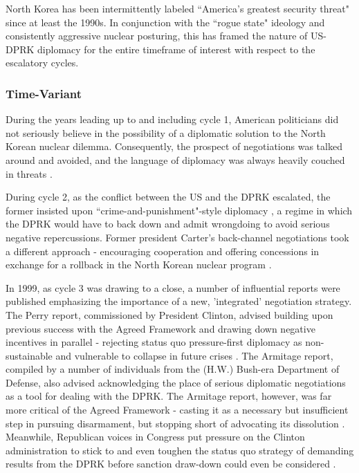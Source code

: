 \documentclass{article}
\begin{document}
North Korea has been intermittently labeled ``America's greatest security threat"\cite{cumings} since at least the 1990s. In conjunction with the ``rogue state" ideology and consistently aggressive nuclear posturing, this has framed the nature of US-DPRK diplomacy for the entire timeframe of interest with respect to the escalatory cycles.

\subsubsection{Time-Variant}

During the years leading up to and including cycle 1, American politicians did not seriously believe in the possibility of a diplomatic solution to the North Korean nuclear dilemma. Consequently, the prospect of negotiations was talked around and avoided, and the language of diplomacy was always heavily couched in threats \cite{sigal}.

During cycle 2, as the conflict between the US and the DPRK escalated, the former insisted upon ``crime-and-punishment"-style diplomacy \cite{bleiker}, a regime in which the DPRK would have to back down and admit wrongdoing to avoid serious negative repercussions. Former president Carter's back-channel negotiations took a different approach - encouraging cooperation and offering concessions in exchange for a rollback in the North Korean nuclear program \cite{sigal}.

In 1999, as cycle 3 was drawing to a close, a number of influential reports were published emphasizing the importance of a new, 'integrated' negotiation strategy. The Perry report, commissioned by President Clinton, advised building upon previous success with the Agreed Framework and drawing down negative incentives in parallel - rejecting status quo pressure-first diplomacy as non-sustainable and vulnerable to collapse in future crises \cite{perry}. The Armitage report, compiled by a number of individuals from the (H.W.) Bush-era Department of Defense, also advised acknowledging the place of serious diplomatic negotiations as a tool for dealing with the DPRK. The Armitage report, however, was far more critical of the Agreed Framework - casting it as a necessary but insufficient step in pursuing disarmament, but stopping short of advocating its dissolution \cite{armitage}. Meanwhile, Republican voices in Congress put pressure on the Clinton administration to stick to and even toughen the status quo strategy of demanding results from the DPRK before sanction draw-down could even be considered \cite{harnisch}. 
\end{document}
